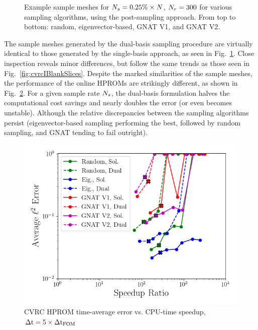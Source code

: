 \begin{figure}
\begin{minipage}{0.99\linewidth}
	\end{minipage}
	\caption{\label{fig:cvrcIBlankSlicesDual}Example sample meshes for $N_s = 0.25\% \times N$, $N_r = 300$ for various sampling algorithms, using the post-sampling approach. From top to bottom: random, eigenvector-based, GNAT V1, and GNAT V2.}
\end{figure}

The sample meshes generated by the dual-basis sampling procedure are virtually identical to those generated by the single-basis approach, as seen in Fig.~\ref{fig:cvrcIBlankSlicesDual}. Close inspection reveals minor differences, but follow the same trends as those seen in Fig.~\ref{fig:cvrcIBlankSlices}. Despite the marked similarities of the sample meshes, the performance of the online HPROMs are strikingly different, as shown in Fig.~\ref{fig:cvrcSampledROMErrVsTimeDual}. For a given sample rate $N_s$, the dual-basis formulation halves the computational cost savings and nearly doubles the error (or even becomes unstable). Although the relative discrepancies between the sampling algorithms persist (eigenvector-based sampling performing the best, followed by random sampling, and GNAT tending to fail outright).

\begin{figure}
	\centering
	\includegraphics[width=0.6\linewidth]{Chapters/HPROMResults/Images/cvrc/dualModes/sampled_dt5e-7_Average_errorRaw_pareto.png}
	\caption{\label{fig:cvrcSampledROMErrVsTimeDual}CVRC HPROM time-average error vs. CPU-time speedup, $\Delta \text{t} = 5 \times \Delta \text{t}_{\text{FOM}}$}
\end{figure}

